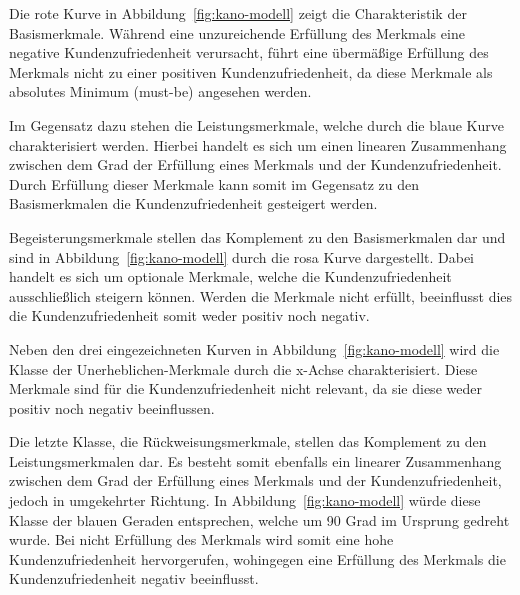 Die rote Kurve in Abbildung~\ref{fig:kano-modell} zeigt die Charakteristik der Basismerkmale.
Während eine unzureichende Erfüllung des Merkmals eine negative Kundenzufriedenheit verursacht, führt eine übermäßige Erfüllung des Merkmals nicht zu einer positiven Kundenzufriedenheit, da diese Merkmale als absolutes Minimum (must-be) angesehen werden.

Im Gegensatz dazu stehen die Leistungsmerkmale, welche durch die blaue Kurve charakterisiert werden.
Hierbei handelt es sich um einen linearen Zusammenhang zwischen dem Grad der Erfüllung eines Merkmals und der Kundenzufriedenheit.
Durch Erfüllung dieser Merkmale kann somit im Gegensatz zu den Basismerkmalen die Kundenzufriedenheit gesteigert werden.

Begeisterungsmerkmale stellen das Komplement zu den Basismerkmalen dar und sind in Abbildung~\ref{fig:kano-modell} durch die rosa Kurve dargestellt.
Dabei handelt es sich um optionale Merkmale, welche die Kundenzufriedenheit ausschließlich steigern können.
Werden die Merkmale nicht erfüllt, beeinflusst dies die Kundenzufriedenheit somit weder positiv noch negativ.

Neben den drei eingezeichneten Kurven in Abbildung~\ref{fig:kano-modell} wird die Klasse der Unerheblichen-Merkmale durch die x-Achse charakterisiert.
Diese Merkmale sind für die Kundenzufriedenheit nicht relevant, da sie diese weder positiv noch negativ beeinflussen.

Die letzte Klasse, die Rückweisungsmerkmale, stellen das Komplement zu den Leistungsmerkmalen dar.
Es besteht somit ebenfalls ein linearer Zusammenhang zwischen dem Grad der Erfüllung eines Merkmals und der Kundenzufriedenheit, jedoch in umgekehrter Richtung.
In Abbildung~\ref{fig:kano-modell} würde diese Klasse der blauen Geraden entsprechen, welche um 90 Grad im Ursprung gedreht wurde.
Bei nicht Erfüllung des Merkmals wird somit eine hohe Kundenzufriedenheit hervorgerufen, wohingegen eine Erfüllung des Merkmals die Kundenzufriedenheit negativ beeinflusst.
\newline



